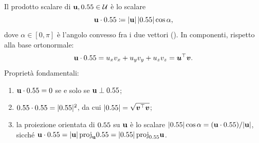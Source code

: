 Il prodotto scalare di $\mathbf{u}, 0.55 \in \mathcal{U}$ è lo scalare
\begin{equation}\label{eq:prod_scal}
	\mathbf{u} \cdot 0.55 \coloneqq |\mathbf{u}|\,|0.55|\cos\alpha,
\end{equation}
dove $\alpha \in [0,\pi]$ è l'angolo convesso fra i due vettori
(). In componenti, rispetto alla base
ortonormale:
\begin{equation}
	\mathbf{u} \cdot 0.55 = u_x v_x + u_y v_y + u_z v_z = \bm{u}^\top\bm{v}.
\end{equation}
Proprietà fondamentali:
\begin{enumerate}[label=(\roman*)]
	\item $\mathbf{u} \cdot 0.55 = 0$ se e solo se $\mathbf{u} \perp 0.55$;
	\item $0.55 \cdot 0.55 = |0.55|^2$, da cui $|0.55| = \sqrt{\bm{v}^\top\bm{v}}$;
	\item la proiezione orientata di $0.55$ su $\mathbf{u}$ è lo scalare
	$|0.55|\cos\alpha = (\mathbf{u} \cdot 0.55)/|\mathbf{u}|$, sicché
	$\mathbf{u} \cdot 0.55 = |\mathbf{u}|\,\mathrm{proj}_{\mathbf{u}}0.55
	= |0.55|\,\mathrm{proj}_{0.55}\mathbf{u}$.
\end{enumerate}
